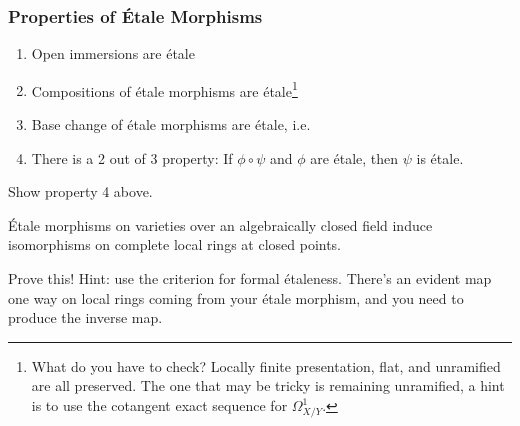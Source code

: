 \hypertarget{properties-of-uxe9tale-morphisms}{%
\subsubsection{Properties of Étale
Morphisms}\label{properties-of-uxe9tale-morphisms}}

\begin{proposition}

\envlist

\begin{enumerate}
\def\labelenumi{\arabic{enumi}.}
\tightlist
\item
  Open immersions are étale
\item
  Compositions of étale morphisms are étale\footnote{What do you have to
    check? Locally finite presentation, flat, and unramified are all
    preserved. The one that may be tricky is remaining unramified, a
    hint is to use the cotangent exact sequence for \(\Omega^1_{X/Y}\).}
\item
  Base change of étale morphisms are étale, i.e.~

  \begin{center}
  \end{center}
\item
  There is a 2 out of 3 property: If \(\phi \circ \psi\) and \(\phi\)
  are étale, then \(\psi\) is étale.
\end{enumerate}

\end{proposition}

\begin{exercise}[?]

Show property 4 above.

\end{exercise}

\begin{proposition}[?]

Étale morphisms on varieties over an algebraically closed field induce
isomorphisms on complete local rings at closed points.

\end{proposition}

\begin{exercise}[?]

Prove this! Hint: use the criterion for formal étaleness. There's an
evident map one way on local rings coming from your étale morphism, and
you need to produce the inverse map.

\end{exercise}

